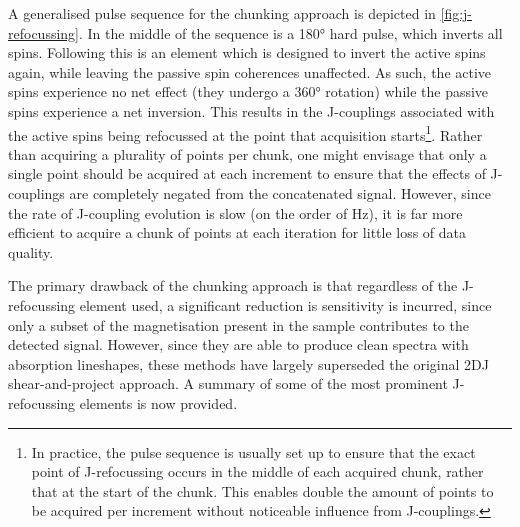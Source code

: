 A generalised pulse sequence for the chunking approach is depicted in
\cref{fig:j-refocussing}. In the middle of the sequence is a \ang{180} hard
pulse, which inverts all spins. Following this is an element which is designed
to invert the active spins again, while leaving the passive spin coherences
unaffected. As such, the active spins experience no net effect (they
undergo a \ang{360} rotation) while the passive spins experience a net inversion.
This results in the J-couplings associated with the active spins being
refocussed at the point that acquisition starts\footnote{
    In practice, the pulse sequence is usually set up to ensure that the exact
    point of J-refocussing occurs in the middle of each acquired chunk, rather
    that at the start of the chunk. This enables double the amount
    of points to be acquired per increment without noticeable influence from
    J-couplings.
}.
Rather than acquiring a plurality of points per chunk, one might envisage that only a
single point should be acquired at each increment to
ensure that the effects of J-couplings are completely negated from the
concatenated signal. However, since the rate of J-coupling evolution is
slow (on the order of \unit{\hertz}), it is far more efficient to acquire a
chunk of points at each iteration for little loss of data quality.

The primary drawback of the chunking approach is that regardless of the
J-refocussing element used, a significant reduction is sensitivity is incurred,
since only a subset of the magnetisation present in the sample contributes to
the detected signal. However, since they are able to produce clean
spectra with absorption lineshapes, these methods have largely superseded the
original \ac{2DJ} shear-and-project approach. A summary of some of the most
prominent J-refocussing elements is now provided.

